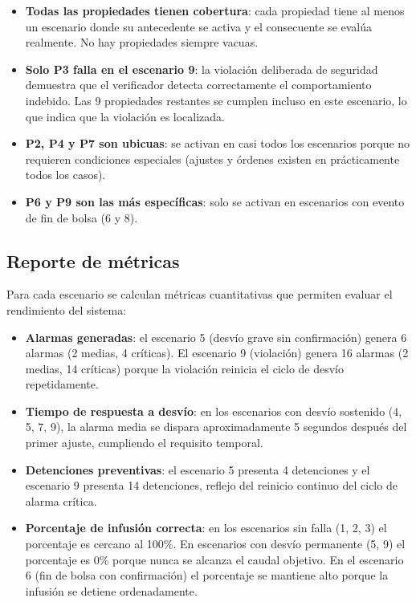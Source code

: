 \documentclass[12pt,a4paper]{article}
\begin{document}
\begin{itemize}
    \item \textbf{Todas las propiedades tienen cobertura}: cada
    propiedad tiene al menos un escenario donde su antecedente se
    activa y el consecuente se evalúa realmente.  No hay propiedades
    siempre vacuas.

    \item \textbf{Solo P3 falla en el escenario 9}: la violación
    deliberada de seguridad demuestra que el verificador detecta
    correctamente el comportamiento indebido.  Las 9 propiedades
    restantes se cumplen incluso en este escenario, lo que indica que
    la violación es localizada.

    \item \textbf{P2, P4 y P7 son ubicuas}: se activan en casi todos
    los escenarios porque no requieren condiciones especiales (ajustes
    y órdenes existen en prácticamente todos los casos).

    \item \textbf{P6 y P9 son las más específicas}: solo se activan
    en escenarios con evento de fin de bolsa (6 y 8).
\end{itemize}

\subsection{Reporte de métricas}

Para cada escenario se calculan métricas cuantitativas que permiten
evaluar el rendimiento del sistema:

\begin{itemize}
    \item \textbf{Alarmas generadas}: el escenario 5 (desvío grave sin
    confirmación) genera 6 alarmas (2 medias, 4 críticas).  El
    escenario 9 (violación) genera 16 alarmas (2 medias, 14 críticas)
    porque la violación reinicia el ciclo de desvío repetidamente.

    \item \textbf{Tiempo de respuesta a desvío}: en los escenarios
    con desvío sostenido (4, 5, 7, 9), la alarma media se dispara
    aproximadamente 5 segundos después del primer ajuste, cumpliendo
    el requisito temporal.

    \item \textbf{Detenciones preventivas}: el escenario 5 presenta
    4 detenciones y el escenario 9 presenta 14 detenciones, reflejo
    del reinicio continuo del ciclo de alarma crítica.

    \item \textbf{Porcentaje de infusión correcta}: en los escenarios
    sin falla (1, 2, 3) el porcentaje es cercano al 100\%.  En
    escenarios con desvío permanente (5, 9) el porcentaje es 0\%
    porque nunca se alcanza el caudal objetivo.  En el escenario 6
    (fin de bolsa con confirmación) el porcentaje se mantiene alto
    porque la infusión se detiene ordenadamente.
\end{itemize}
\end{document}
